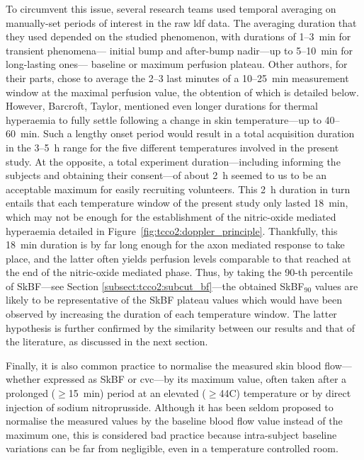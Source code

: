 To circumvent this issue, several research teams used temporal averaging on manually-set periods of interest in the raw \gls{ldf} data. The averaging duration that they used depended on the studied phenomenon, with durations of 1--3~min for transient phenomena---\ie{} initial bump and after-bump nadir---up to 5--10~min for long-lasting ones---\ie{} baseline or maximum perfusion plateau\cite{minson2001, frantz2012}. Other authors, for their parts, chose to average the 2--3 last minutes of a 10--25~min measurement window at the maximal perfusion value, the obtention of which is detailed below\cite{kellogg2008, hodges2016}. However, Barcroft, Taylor, \etal{}\cite{barcroft1943, taylor1984} mentioned even longer durations for thermal hyperaemia to fully settle following a change in skin temperature---up to 40--60~min. Such a lengthy onset period would result in a total acquisition duration in the 3--5~h range for the five different temperatures involved in the present study. At the opposite, a total experiment duration---including informing the subjects and obtaining their consent---of about 2~h seemed to us to be an acceptable maximum for easily recruiting volunteers. This 2~h duration in turn entails that each temperature window of the present study only lasted 18~min, which may not be enough for the establishment of the nitric-oxide mediated hyperaemia detailed in Figure~\ref{fig:tcco2:doppler_principle}. Thankfully, this 18~min duration is by far long enough for the axon mediated response to take place, and the latter often yields perfusion levels comparable to that reached at the end of the nitric-oxide mediated phase\cite{kellogg2008, minson2010, frantz2012,}. Thus, by taking the 90-th percentile of SkBF---see Section \ref{subsect:tcco2:subcut_bf}---the obtained SkBF$_{90}$ values are likely to be representative of the SkBF plateau values which would have been observed by increasing the duration of each temperature window. The latter hypothesis is further confirmed by the similarity between our results and that of the literature, as discussed in the next section.

Finally, it is also common practice to normalise the measured skin blood flow---whether expressed as SkBF or \gls{cvc}---by its maximum value, often taken after a prolonged ($\geq$15~min) period at an elevated ($\geq$44{\degree}C) temperature\cite{taylor1984, vionnet2014, hodges2016} or by direct injection of sodium nitroprusside\cite{kellogg2008}. Although it has been seldom proposed to normalise the measured values by the baseline blood flow value instead of the maximum one\cite{magerl1996, mayrovitz2001}, this is considered bad practice because intra-subject baseline variations can be far from negligible, even in a temperature controlled room\cite{bircher1994, cracowski2006}.

